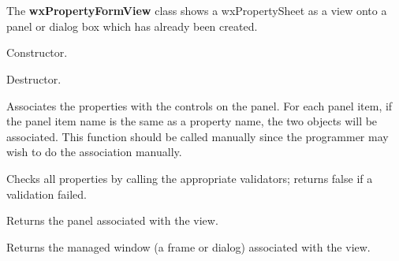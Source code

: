 \section{}\label{wxpropertyformview}

The {\bf wxPropertyFormView} class shows a wxPropertySheet as a view onto a panel or dialog
box which has already been created.






Constructor.



Destructor.

\label{wxpropertyformviewassociatenames}


Associates the properties with the controls on the panel. For each panel item, if the
panel item name is the same as a property name, the two objects will be associated.
This function should be called manually since the programmer may wish to do the
association manually.

\label{wxpropertyformviewcheck}


Checks all properties by calling the appropriate validators; returns false if a validation failed.

\label{wxpropertyformviewgetpanel}


Returns the panel associated with the view.

\label{wxpropertyformviewgetmanagedwindow}


Returns the managed window (a frame or dialog) associated with the view.

